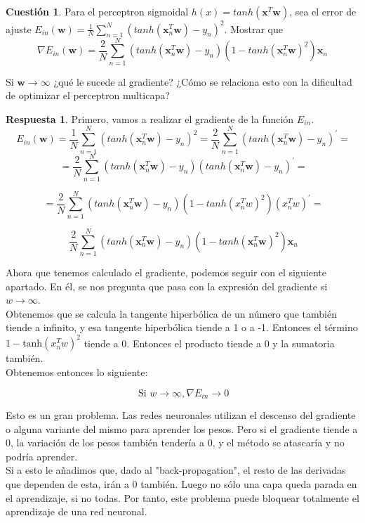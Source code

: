\documentclass[10pt,a4paper]{article}
\theoremstyle{definition}
\newtheorem{cuestion}{Cuestión}
\newtheorem*{respuesta}{Respuesta}
\begin{document}
\begin{cuestion}
Para el perceptron sigmoidal $h(x) = tanh(\mathbf{x}^T\mathbf{w})$, sea el error de ajuste $E_{in}(\mathbf{w}) = \frac{1}{N} \sum_{n=1}^N (tanh(\mathbf{x}_n^T\mathbf{w}) - y_n)^2$. Mostrar que
\[ \nabla E_{in}(\mathbf{w}) = \frac{2}{N} \sum_{n=1}^N (tanh(\mathbf{x}_n^T \mathbf{w}) -y_n) (1-tanh(\mathbf{x}_n^T \mathbf{w})^2)\mathbf{x}_n	\]

Si $\mathbf{w} \rightarrow \infty$ ¿qué le sucede al gradiente? ¿Cómo se relaciona esto con la dificultad de optimizar el perceptron multicapa?\\
\end{cuestion}
\begin{respuesta}
Primero, vamos a realizar el gradiente de la función $E_{in}$.\\

\[
\ E_{in}(\mathbf{w}) = \frac{1}{N} \sum_{n=1}^N (tanh(\mathbf{x}_n^T\mathbf{w}) - y_n)^2 =  \frac{2}{N} \sum_{n=1}^N (tanh(\mathbf{x}_n^T\mathbf{w}) - y_n)^{\prime}=
\]
\[
\ = \frac{2}{N} \sum_{n=1}^N (tanh(\mathbf{x}_n^T\mathbf{w}) - y_n) (tanh(\mathbf{x}_n^T\mathbf{w}) - y_n)^{\prime} = 
\]

\[
\ = \frac{2}{N} \sum_{n=1}^N (tanh(\mathbf{x}_n^T\mathbf{w}) - y_n) (1 - tanh(x_n^Tw)^2)(x_n^Tw)^{\prime} = 
\]

\[
\ \frac{2}{N} \sum_{n=1}^N (tanh(\mathbf{x}_n^T \mathbf{w}) -y_n) (1-tanh(\mathbf{x}_n^T \mathbf{w})^2)\mathbf{x}_n
\]

Ahora que tenemos calculado el gradiente, podemos seguir con el siguiente apartado. En él, se nos pregunta que pasa con la expresión del gradiente si $w \rightarrow \infty$.\\

Obtenemos que se calcula la tangente hiperbólica de un número que también tiende a infinito, y esa tangente hiperbólica tiende a 1 o a -1. Entonces el término $1-\textrm{tanh}(x_n^Tw)^2$ tiende a 0. Entonces el producto tiende a 0 y la sumatoria también.\\
 
Obtenemos entonces lo siguiente:

\[
\ \textrm{Si }w \rightarrow \infty ,  \nabla E_{in} \rightarrow 0
\]

Esto es un gran problema. Las redes neuronales utilizan el descenso del gradiente o alguna variante del mismo para aprender los pesos. Pero si el gradiente tiende a 0, la variación de los pesos también tendería a 0, y el método se atascaría y no podría aprender.\\

Si a esto le añadimos que, dado al "back-propagation", el resto de las derivadas que dependen de esta, irán a 0 también. Luego no sólo una capa queda parada en el aprendizaje, si no todas. Por tanto, este problema puede bloquear totalmente el aprendizaje de una red neuronal.

\end{respuesta}
\end{document}
